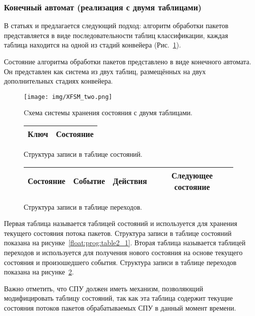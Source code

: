 \documentclass[conference]{IEEEtran}
\begin{document}
\subsubsection{Конечный автомат (реализация с двумя таблицами)}
В статьях \cite{bib:Cascone:management} и \cite{bib:Pontarelli:hardware}
предлагается следующий подход: алгоритм обработки пакетов представляется
в виде последовательности таблиц классификации, каждая таблица находится
на одной из стадий конвейера (Рис.~\ref{float:prog:table_two_general}).

Состояние алгоритма обработки пакетов представлено в виде конечного автомата.
Он представлен как система из двух таблиц, размещённых на двух
дополнительных стадиях конвейера.

\begin{figure}
	\centering
	\texttt{[image: img/XFSM\_two.png]}
	\caption{Cхема системы хранения состояния с двумя таблицами.}
	\label{float:prog:table_two_general}
\end{figure}

\begin{figure}
	\centering

	\begin{tabular}{|c|c|}
		\hline
		Ключ & Состояние \\
		\hline

	\end{tabular}

	\caption{Структура записи в таблице состояний.}
	\label{float:prog:table2_1}
	\centerline{}
	{\small
	\begin{tabular}{|c|c|c|c|}
		\hline
		Состояние & Событие & Действия & Следующее состояние \\
		\hline

	\end{tabular}
	}
	\caption{Структура записи в таблице переходов.}
	\label{float:prog:table2_2}
\end{figure}

Первая таблица называется таблицей состояний и используется для хранения
текущего состояния потока пакетов. Структура записи в таблице состояний
показана на рисунке~\ref{float:prog:table2_1}.
Вторая таблица называется таблицей переходов и используется для получения
нового состояния на основе текущего состояния и произошедшего события.
Структура записи в таблице переходов показана на
рисунке~\ref{float:prog:table2_2}.

Важно отметить, что СПУ должен иметь механизм, позволяющий модифицировать
таблицу состояний, так как эта таблица содержит текущие состояния потоков
пакетов обрабатываемых СПУ в данный момент времени.
\end{document}
